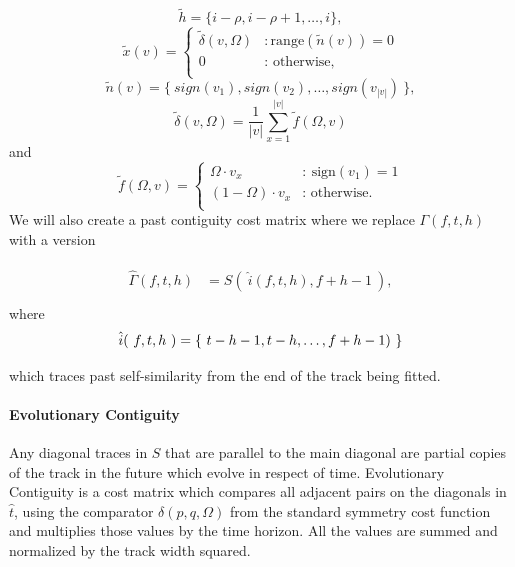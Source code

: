 \documentclass[twocolumn]{article}
\begin{document}
\begin{dmath*}
\tilde{h} = \{i-\rho,i-\rho+1, \ldots,i \},
\end{dmath*}
\begin{dmath*}
\tilde{x}(v) = { \left\{ 
	\begin{array}{lr}
		  \tilde \delta( v, \Omega ) & : \mathrm{range}( \tilde{n}(v) ) = 0  \\
		0 & : \mbox{~otherwise,} \\
	\end{array}
	\right.}
\end{dmath*}
\begin{dmath*}
	\tilde{n}(v) = \{~ sign(v_1), sign(v_2),\ldots, sign(v_{|v|}) ~\},
\end{dmath*}
\begin{dmath*}\tilde \delta( v, \Omega ) = \frac{1}{|v|} \sum^{|v|}_{x=1}
		\tilde{f}(\Omega, v) 
\end{dmath*}	
	and
	\begin{dmath*}
	\tilde{f}(\Omega, v) = \left\{ 
	\begin{array}{lr}
		\Omega \cdot v_x &:  ~\mathrm{sign}(v_1)=1 \\
		(1-\Omega) \cdot v_x &: \mbox{~otherwise.}    \\
	\end{array}
	\right.
\end{dmath*}
	We will also create a past contiguity cost matrix where we replace $\Gamma( f,t,h )$ with a version 

\begin{align*}
\begin{array}{ll}
\hat{\Gamma}( f,t,h ) &= S(~\hat{i}(f, t, h), f + h - 1~),\\
\end{array}
\end{align*}
where
\begin{dmath*}
	\hat{i}(~f, t, h~) =\\ \{~ t - h - 1, t - h, \ldots, f+h-1 ) ~\}
\end{dmath*}

	which traces past self-similarity from the end of the track being fitted.
	
	\paragraph{Evolutionary Contiguity}
	
	Any diagonal traces in $S$ that are parallel to the main diagonal are partial copies of the track in the future which evolve in respect of time. Evolutionary Contiguity is a cost matrix which compares all adjacent pairs on the diagonals in $\hat t$, using the comparator $\delta( p,q, \Omega )$ from the standard symmetry cost function and multiplies those values by the time horizon. All the values are summed and normalized by the track width squared. 
	
\end{document}
